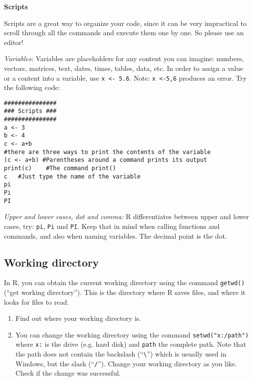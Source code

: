 \documentclass{article}
\begin{document}
\begin{solution}
\textbf{Scripts}

Scripts are a great way to organize your code, since it can be very impractical to scroll through all the commands and execute them one by one. So please use an editor!

\emph{Variables:} Variables are placeholders for any content you can imagine: numbers, vectors, matrices, text, dates, times, tables, data, etc. In order to assign a value or a content into a variable, use \texttt{x <- 5.6}. Note: \texttt{x <-5,6} produces an error. Try the following code:

\begin{verbatim}
###############
### Scripts ###
###############
a <- 3
b <- 4
c <- a+b
#there are three ways to print the contents of the variable
(c <- a+b) #Parentheses around a command prints its output
print(c)   	#The command print()
c	#Just type the name of the variable
pi
Pi
PI
\end{verbatim}

\emph{Upper and lower cases, dot and comma:} R differentiates between upper and lower cases, try: \texttt{pi}, \texttt{Pi} und \texttt{PI}. Keep that in mind when calling functions and commands, and also when naming variables. The decimal point is the dot.
\end{solution}

\subsection{Working directory}

In R, you can obtain the current working directory using the command \texttt{getwd()} (\textquotedblleft get working directory\textquotedblright ). This is the directory where R saves files, and where it looks for files to read.

\begin{enumerate}
\item Find out where your working directory is.

\item You can change the working directory using the command \texttt{setwd("x:/path")} where \texttt{x:} is the drive (e.g. hard disk) and \texttt{path} the complete path. Note that the path does not contain the backslash (\textquotedblleft \texttt{\textbackslash}\textquotedblright ) which is usually used in Windows, but the slash (\textquotedblleft \texttt{/}\textquotedblright ). Change your working directory as you like. Check if the change was successful.
\end{enumerate}
\end{document}
